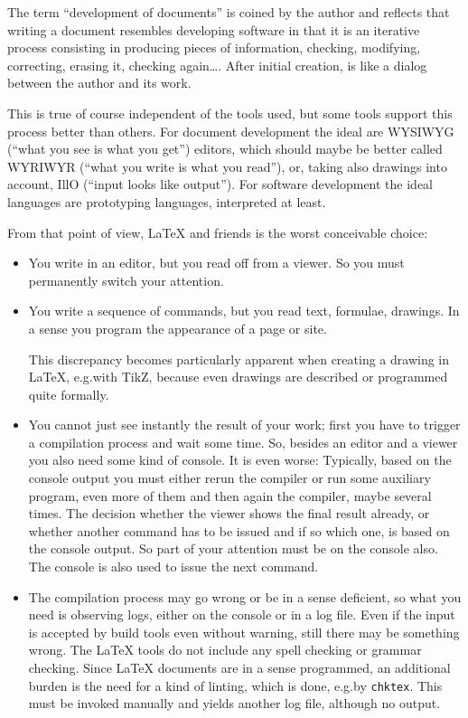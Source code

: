 The term ``development of documents'' is coined by the author 
and reflects that writing a document 
resembles developing software 
in that it is an iterative process consisting in producing pieces of information, 
checking, modifying, correcting, erasing it, checking again\dots. 
After initial creation, is like a dialog between the author and its work. 

This is true of course independent of the tools used, 
but some tools support this process better than others. 
For document development the ideal are WYSIWYG (``what you see is what you get'') editors, 
which should maybe be better called WYRIWYR (``what you write is what you read''), 
or, taking also drawings into account, IllO (``input looks like output''). %
For software development the ideal languages are prototyping languages, interpreted at least. 

From that point of view, \LaTeX{} and friends is the worst conceivable choice: 
%
\begin{itemize}
  \item
  You write in an editor, but you read off from a viewer. 
  So you must permanently switch your attention. 
  \item
  You write a sequence of commands, but you read text, formulae, drawings. 
  In a sense you program the appearance of a page or site. 

  This discrepancy becomes particularly apparent when creating a drawing in \LaTeX, 
  e.g.\@ with TikZ, because even drawings are described or programmed quite formally. 
  \item
  You cannot just see instantly the result of your work; 
  first you have to trigger a compilation process and wait some time. 
  So, besides an editor and a viewer you also need some kind of console. 
  It is even worse: 
  Typically, based on the console output you must either rerun the compiler 
  or run some auxiliary program, even more of them 
  and then again the compiler, maybe several times. 
  The decision whether the viewer shows the final result already, 
  or whether another command has to be issued and if so which one, 
  is based on the console output. 
  So part of your attention must be on the console also. 
  The console is also used to issue the next command. 
  \item 
  The compilation process may go wrong or be in a sense deficient, 
  so what you need is observing logs, either on the console or in a log file. 
  Even if the input is accepted by build tools even without warning, 
  still there may be something wrong. 
  The \LaTeX{} tools do not include any spell checking or grammar checking. 
  Since \LaTeX{} documents are in a sense programmed, 
  an additional burden is the need for a kind of linting, 
  which is done, e.g.\@ by \texttt{chktex}. 
  This must be invoked manually and yields another log file, 
  although no output. 
\end{itemize}

